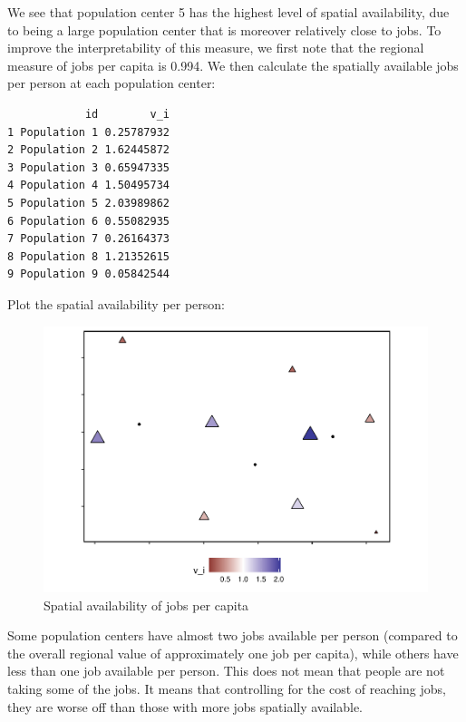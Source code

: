 \documentclass[]{elsarticle} %
\begin{document}
We see that population center 5 has the highest level of spatial
availability, due to being a large population center that is moreover
relatively close to jobs. To improve the interpretability of this
measure, we first note that the regional measure of jobs per capita is
0.994. We then calculate the spatially available jobs per person at each
population center:

\begin{verbatim}
            id        v_i
1 Population 1 0.25787932
2 Population 2 1.62445872
3 Population 3 0.65947335
4 Population 4 1.50495734
5 Population 5 2.03989862
6 Population 6 0.55082935
7 Population 7 0.26164373
8 Population 8 1.21352615
9 Population 9 0.05842544
\end{verbatim}

Plot the spatial availability per person:

\begin{figure}
\includegraphics[width=1\linewidth]{Spatial-Availability_files/figure-latex/toy-example-availability-jobs-per-capita-1} \caption{\label{fig:toy-example-availability-jobs-per-capita}Spatial availability of jobs per capita}\label{fig:toy-example-availability-jobs-per-capita}
\end{figure}

Some population centers have almost two jobs available per person
(compared to the overall regional value of approximately one job per
capita), while others have less than one job available per person. This
does not mean that people are not taking some of the jobs. It means that
controlling for the cost of reaching jobs, they are worse off than those
with more jobs spatially available.
\end{document}
